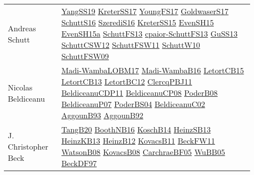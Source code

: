 {\begin{longtable}{p{4cm}p{20cm}}
Andreas Schutt & \href{papers/YangSS19.pdf}{YangSS19}\cite{YangSS19} \href{articles/KreterSS17.pdf}{KreterSS17}\cite{KreterSS17} \href{papers/YoungFS17.pdf}{YoungFS17}\cite{YoungFS17} \href{papers/GoldwaserS17.pdf}{GoldwaserS17}\cite{GoldwaserS17} \href{papers/SchuttS16.pdf}{SchuttS16}\cite{SchuttS16} \href{papers/SzerediS16.pdf}{SzerediS16}\cite{SzerediS16} \href{papers/KreterSS15.pdf}{KreterSS15}\cite{KreterSS15} \href{papers/EvenSH15.pdf}{EvenSH15}\cite{EvenSH15} \href{articles/EvenSH15a.pdf}{EvenSH15a}\cite{EvenSH15a} \href{papers/SchuttFS13.pdf}{SchuttFS13}\cite{SchuttFS13} \href{papers/cpaior-SchuttFS13.pdf}{cpaior-SchuttFS13}\cite{cpaior-SchuttFS13} \href{papers/GuSS13.pdf}{GuSS13}\cite{GuSS13} \href{papers/SchuttCSW12.pdf}{SchuttCSW12}\cite{SchuttCSW12} \href{articles/SchuttFSW11.pdf}{SchuttFSW11}\cite{SchuttFSW11} \href{papers/SchuttW10.pdf}{SchuttW10}\cite{SchuttW10} \href{papers/SchuttFSW09.pdf}{SchuttFSW09}\cite{SchuttFSW09} \\
Nicolas Beldiceanu & \href{papers/Madi-WambaLOBM17.pdf}{Madi-WambaLOBM17}\cite{Madi-WambaLOBM17} \href{papers/Madi-WambaB16.pdf}{Madi-WambaB16}\cite{Madi-WambaB16} \href{articles/LetortCB15.pdf}{LetortCB15}\cite{LetortCB15} \href{papers/LetortCB13.pdf}{LetortCB13}\cite{LetortCB13} \href{papers/LetortBC12.pdf}{LetortBC12}\cite{LetortBC12} \href{papers/ClercqPBJ11.pdf}{ClercqPBJ11}\cite{ClercqPBJ11} \href{articles/BeldiceanuCDP11.pdf}{BeldiceanuCDP11}\cite{BeldiceanuCDP11} \href{papers/BeldiceanuCP08.pdf}{BeldiceanuCP08}\cite{BeldiceanuCP08} \href{papers/PoderB08.pdf}{PoderB08}\cite{PoderB08} \href{papers/BeldiceanuP07.pdf}{BeldiceanuP07}\cite{BeldiceanuP07} \href{articles/PoderBS04.pdf}{PoderBS04}\cite{PoderBS04} \href{papers/BeldiceanuC02.pdf}{BeldiceanuC02}\cite{BeldiceanuC02} \href{articles/AggounB93.pdf}{AggounB93}\cite{AggounB93} \href{}{AggounB92}\cite{AggounB92} \\
J. Christopher Beck & \href{papers/TangB20.pdf}{TangB20}\cite{TangB20} \href{papers/BoothNB16.pdf}{BoothNB16}\cite{BoothNB16} \href{papers/KoschB14.pdf}{KoschB14}\cite{KoschB14} \href{articles/HeinzSB13.pdf}{HeinzSB13}\cite{HeinzSB13} \href{papers/HeinzKB13.pdf}{HeinzKB13}\cite{HeinzKB13} \href{papers/HeinzB12.pdf}{HeinzB12}\cite{HeinzB12} \href{articles/KovacsB11.pdf}{KovacsB11}\cite{KovacsB11} \href{}{BeckFW11}\cite{BeckFW11} \href{papers/WatsonB08.pdf}{WatsonB08}\cite{WatsonB08} \href{articles/KovacsB08.pdf}{KovacsB08}\cite{KovacsB08} \href{papers/CarchraeBF05.pdf}{CarchraeBF05}\cite{CarchraeBF05} \href{papers/WuBB05.pdf}{WuBB05}\cite{WuBB05} \href{papers/BeckDF97.pdf}{BeckDF97}\cite{BeckDF97} \\

\end{longtable}}
